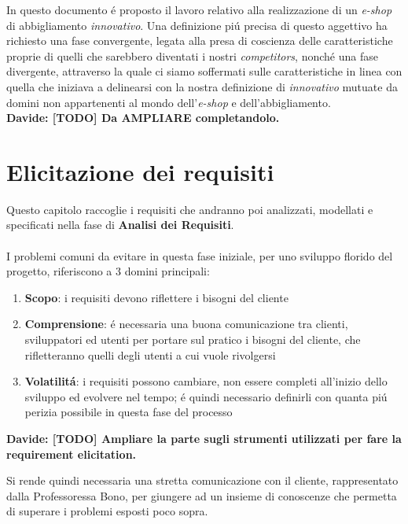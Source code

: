 \documentclass[12pt]{article}
\newcommand{\davide}[1]{{\bf \color{chromeyellow} Davide: #1 }}
\begin{document}
\newpage

\tableofcontents


\newpage

\abstract{}
In questo documento \'e proposto il lavoro relativo alla realizzazione di un \textit{e-shop} di abbigliamento \textit{innovativo}. Una definizione pi\'u precisa di questo aggettivo ha richiesto una fase convergente, legata alla presa di coscienza delle caratteristiche proprie di quelli che sarebbero diventati i nostri \textit{competitors}, nonch\'e una fase divergente, attraverso la quale ci siamo soffermati sulle caratteristiche in linea con quella che iniziava a delinearsi con la nostra definizione di \textit{innovativo} mutuate da domini non appartenenti al mondo dell'\textit{e-shop} e dell'abbigliamento. 
\\
\davide{[TODO] Da AMPLIARE completandolo.}

\newpage

\section{Elicitazione dei requisiti}
Questo capitolo raccoglie i requisiti che andranno poi analizzati, modellati e specificati nella fase di \textbf{Analisi dei Requisiti}. 
\\
\\
I problemi comuni da evitare in questa fase iniziale, per uno sviluppo florido del progetto, riferiscono a 3 domini principali:
\begin{enumerate}
	\item \textbf{Scopo}: i requisiti devono riflettere i bisogni del cliente
	\item \textbf{Comprensione}: \'e necessaria una buona comunicazione tra clienti, sviluppatori ed utenti per portare sul pratico i bisogni del cliente, che rifletteranno quelli degli utenti a cui vuole rivolgersi
	\item \textbf{Volatilit\'a}: i requisiti possono cambiare, non essere completi all'inizio dello sviluppo ed evolvere nel tempo; \'e quindi necessario definirli con quanta pi\'u perizia possibile in questa fase del processo
\end{enumerate}

\davide{\textbf{[TODO]} Ampliare la parte sugli strumenti utilizzati per fare la requirement elicitation.}

Si rende quindi necessaria una stretta comunicazione con il cliente, rappresentato dalla Professoressa Bono, per giungere ad un insieme di conoscenze che permetta di superare i problemi esposti poco sopra.
\end{document}
